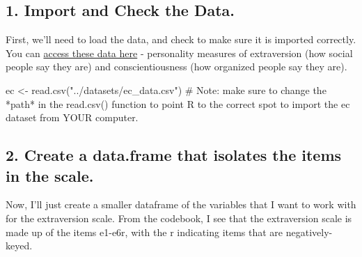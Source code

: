 \documentclass[
  letterpaper,
  DIV=11,
  numbers=noendperiod,
  oneside]{scrreprt}
\newenvironment{Shaded}{\begin{snugshade}}{\end{snugshade}}
\newcommand{\CommentTok}[1]{\textcolor[rgb]{0.37,0.37,0.37}{#1}}
\newcommand{\FunctionTok}[1]{\textcolor[rgb]{0.28,0.35,0.67}{#1}}
\newcommand{\NormalTok}[1]{\textcolor[rgb]{0.00,0.23,0.31}{#1}}
\newcommand{\OtherTok}[1]{\textcolor[rgb]{0.00,0.23,0.31}{#1}}
\newcommand{\SpecialCharTok}[1]{\textcolor[rgb]{0.37,0.37,0.37}{#1}}
\newcommand{\StringTok}[1]{\textcolor[rgb]{0.13,0.47,0.30}{#1}}
\begin{document}
\subsection{1. Import and Check the
Data.}\label{import-and-check-the-data.}

First, we'll need to load the data, and check to make sure it is
imported correctly. You can
\href{https://www.dropbox.com/scl/fi/pz4h809xrhhio25lxc3bo/ec_data.csv?rlkey=0ddbyeid39y21miu2xu04ntnj&dl=0}{access
these data here} - personality measures of extraversion (how social
people say they are) and conscientiousness (how organized people say
they are).

\begin{Shaded}
\begin{Highlighting}[]
\NormalTok{ec }\OtherTok{\textless{}{-}} \FunctionTok{read.csv}\NormalTok{(}\StringTok{"../datasets/ec\_data.csv"}\NormalTok{) }\CommentTok{\# Note: make sure to change the *path* in the \textasciigrave{}read.csv()\textasciigrave{} function to point R to the correct spot to import the ec dataset from YOUR computer.}
\end{Highlighting}
\end{Shaded}

\subsection{2. Create a data.frame that isolates the items in the
scale.}\label{create-a-data.frame-that-isolates-the-items-in-the-scale.}

Now, I'll just create a smaller dataframe of the variables that I want
to work with for the extraversion scale. From the codebook, I see that
the extraversion scale is made up of the items e1-e6r, with the r
indicating items that are negatively-keyed.

\begin{Shaded}
\end{Shaded}
\end{document}
